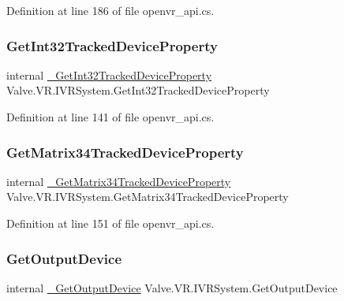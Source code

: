 Definition at line 186 of file openvr\+\_\+api.\+cs.

\mbox{\label{struct_valve_1_1_v_r_1_1_i_v_r_system_ad2b2ee545a313585fffd1971cd1be4bf}} 
\subsubsection{\texorpdfstring{GetInt32TrackedDeviceProperty}{GetInt32TrackedDeviceProperty}}
{\footnotesize\ttfamily internal \mbox{\hyperlink{struct_valve_1_1_v_r_1_1_i_v_r_system_a0201a1804a9833cfe2834c810ee97893}{\+\_\+\+Get\+Int32\+Tracked\+Device\+Property}} Valve.\+V\+R.\+I\+V\+R\+System.\+Get\+Int32\+Tracked\+Device\+Property}



Definition at line 141 of file openvr\+\_\+api.\+cs.

\mbox{\label{struct_valve_1_1_v_r_1_1_i_v_r_system_a995ec67fd90726b954f37ca8a0f941ea}} 
\subsubsection{\texorpdfstring{GetMatrix34TrackedDeviceProperty}{GetMatrix34TrackedDeviceProperty}}
{\footnotesize\ttfamily internal \mbox{\hyperlink{struct_valve_1_1_v_r_1_1_i_v_r_system_add3a6aac11e39d31852a68b40434aa72}{\+\_\+\+Get\+Matrix34\+Tracked\+Device\+Property}} Valve.\+V\+R.\+I\+V\+R\+System.\+Get\+Matrix34\+Tracked\+Device\+Property}



Definition at line 151 of file openvr\+\_\+api.\+cs.

\mbox{\label{struct_valve_1_1_v_r_1_1_i_v_r_system_ac78a36f65ca807a8cd4332b0ab7549bf}} 
\subsubsection{\texorpdfstring{GetOutputDevice}{GetOutputDevice}}
{\footnotesize\ttfamily internal \mbox{\hyperlink{struct_valve_1_1_v_r_1_1_i_v_r_system_a7b0363d609497bbe2b11d2af5ff2fc07}{\+\_\+\+Get\+Output\+Device}} Valve.\+V\+R.\+I\+V\+R\+System.\+Get\+Output\+Device}



